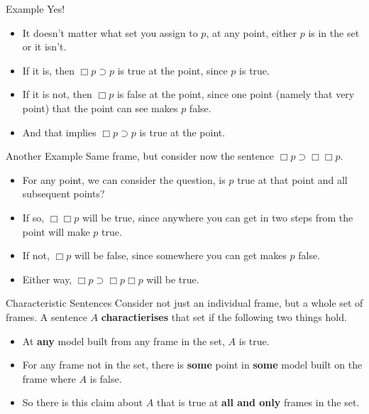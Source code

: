 \documentclass[
  14pt,
  letterpaper,
  ignorenonframetext,
]{beamer}
\providecommand{\tightlist}{%
  \setlength{\itemsep}{0pt}\setlength{\parskip}{0pt}}\usepackage{longtable,booktabs,array}
\begin{document}
\begin{frame}{Example}
\protect\hypertarget{example-1}{}
Yes!

\begin{itemize}
\tightlist
\item
  It doesn't matter what set you assign to \(p\), at any point, either
  \(p\) is in the set or it isn't.
\item
  If it is, then \(\Box p \supset p\) is true at the point, since \(p\)
  is true.
\item
  If it is not, then \(\Box p\) is false at the point, since one point
  (namely that very point) that the point can see makes \(p\) false.
\item
  And that implies \(\Box p \supset p\) is true at the point.
\end{itemize}
\end{frame}

\begin{frame}{Another Example}
\protect\hypertarget{another-example}{}
Same frame, but consider now the sentence
\(\Box p \supset \Box \Box p\).

\begin{itemize}
\tightlist
\item
  For any point, we can consider the question, is \(p\) true at that
  point and all subsequent points?
\item
  If so, \(\Box \Box p\) will be true, since anywhere you can get in two
  steps from the point will make \(p\) true.
\item
  If not, \(\Box p\) will be false, since somewhere you can get makes
  \(p\) false.
\item
  Either way, \(\Box p \supset \Box p \Box p\) will be true.
\end{itemize}
\end{frame}

\begin{frame}{Characteristic Sentences}
\protect\hypertarget{characteristic-sentences}{}
Consider not just an individual frame, but a whole set of frames. A
sentence \(A\) \textbf{charactierises} that set if the following two
things hold.

\begin{itemize}
\tightlist
\item
  At \textbf{any} model built from any frame in the set, \(A\) is true.
\item
  For any frame not in the set, there is \textbf{some} point in
  \textbf{some} model built on the frame where \(A\) is false.
\item
  So there is this claim about \(A\) that is true at \textbf{all and
  only} frames in the set.
\end{itemize}
\end{frame}
\end{document}
